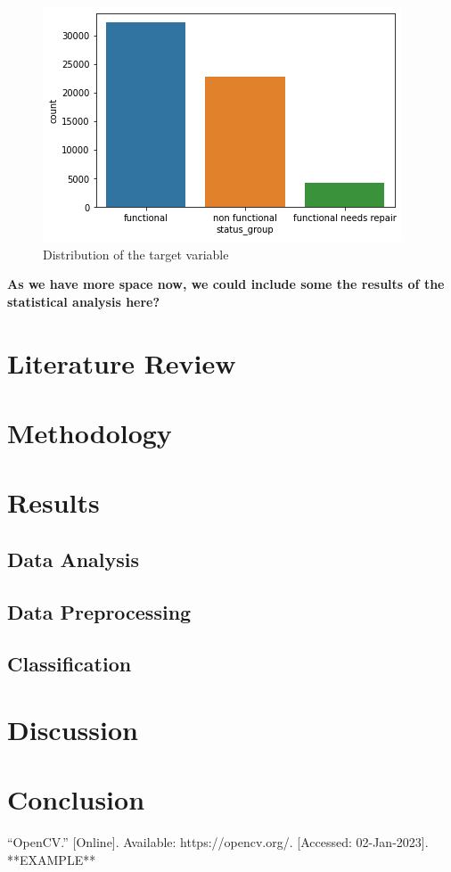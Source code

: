 \documentclass[conference]{IEEEtran}
\begin{document}
\begin{figure}[h]
    \centering
    \includegraphics[scale=0.5]{figures/status_groups.png}
    \caption{Distribution of the target variable}
    \label{fig:status_groups}
\end{figure}


\textbf{As we have more space now, we could include some the results of the statistical analysis here?}

\section{Literature Review}

\section{Methodology}

\section{Results}

\subsection{Data Analysis}

\subsection{Data Preprocessing}

\subsection{Classification}

\section{Discussion}

\section{Conclusion}

\begin{thebibliography}{00}
 “OpenCV.” [Online]. Available: https://opencv.org/. [Accessed: 02-Jan-2023]. **EXAMPLE**
\end{thebibliography}
\end{document}
